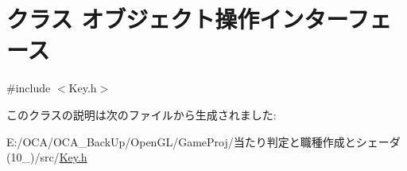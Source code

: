 \hypertarget{class_xE3_x82_xAA_xE3_x83_x96_xE3_x82_xB8_xE3_x82_xA7_xE3_x82_xAF_xE3_x83_x88_xE6_x93_x8D_xE4_xB3fc2265794d84a3364a9ffd9c69ef23d}{\section{クラス オブジェクト操作インターフェース}
\label{class_xE3_x82_xAA_xE3_x83_x96_xE3_x82_xB8_xE3_x82_xA7_xE3_x82_xAF_xE3_x83_x88_xE6_x93_x8D_xE4_xB3fc2265794d84a3364a9ffd9c69ef23d}
}


{\ttfamily \#include $<$Key.\-h$>$}



このクラスの説明は次のファイルから生成されました\-:\begin{DoxyCompactItemize}
\item 
E\-:/\-O\-C\-A/\-O\-C\-A\-\_\-\-Back\-Up/\-Open\-G\-L/\-Game\-Proj/当たり判定と職種作成とシェーダ(10\-\_)/src/\hyperlink{_key_8h}{Key.\-h}\end{DoxyCompactItemize}
